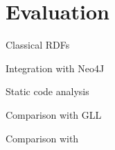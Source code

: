 \section{Evaluation}

Classical RDFs

Integration with Neo4J

Static code analysis

Comparison with GLL

Comparison with ~\cite{ScalaGraphParsing}